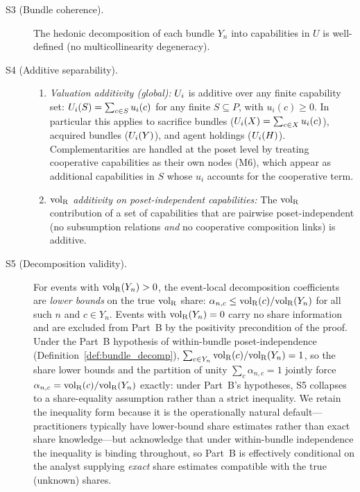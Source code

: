 \begin{description}
\item[S3 (Bundle coherence).] The hedonic decomposition of each
  bundle $Y_n$ into capabilities in $U$ is well-defined (no
  multicollinearity degeneracy).

\item[S4 (Additive separability).] \mbox{}
  \begin{enumerate}
  \item[(a)] \emph{Valuation additivity (global):}
    $U_i$ is additive over any finite capability set:
    $U_i(S) = \sum_{c \in S} u_i(c)$ for any finite
    $S \subseteq P$, with $u_i(c) \geq 0$.  In particular this
    applies to sacrifice bundles ($U_i(X) = \sum_{c \in X}
    u_i(c)$), acquired bundles ($U_i(Y)$), and agent
    holdings ($U_i(H)$).  Complementarities are handled at the
    poset level by treating cooperative capabilities as their
    own nodes (M6), which appear as additional capabilities in
    $S$ whose $u_i$ accounts for the cooperative term.
  \item[(b)] \emph{${\operatorname{vol}_{\mathrm{R}}}$ additivity on poset-independent
    capabilities:} The ${\operatorname{vol}_{\mathrm{R}}}$ contribution of a set of
    capabilities that are pairwise poset-independent (no
    subsumption relations \emph{and} no cooperative composition
    links) is additive.
  \end{enumerate}

\item[S5 (Decomposition validity).] For events with
  ${\operatorname{vol}_{\mathrm{R}}}(Y_n) > 0$, the event-local decomposition
  coefficients are \emph{lower bounds} on the true ${\operatorname{vol}_{\mathrm{R}}}$
  share: $\alpha_{n,c} \leq {\operatorname{vol}_{\mathrm{R}}}(c) / {\operatorname{vol}_{\mathrm{R}}}(Y_n)$ for all
  such $n$ and $c \in Y_n$.  Events with ${\operatorname{vol}_{\mathrm{R}}}(Y_n) = 0$
  carry no share information and are excluded from Part~B by
  the positivity precondition of the proof.  Under the Part~B
  hypothesis of within-bundle poset-independence
  (Definition~\ref{def:bundle_decomp}), $\sum_{c \in Y_n}
  {\operatorname{vol}_{\mathrm{R}}}(c) / {\operatorname{vol}_{\mathrm{R}}}(Y_n) = 1$, so the share lower bounds and
  the partition of unity $\sum_c \alpha_{n,c} = 1$ jointly
  force $\alpha_{n,c} = {\operatorname{vol}_{\mathrm{R}}}(c)/{\operatorname{vol}_{\mathrm{R}}}(Y_n)$ exactly: under
  Part~B's hypotheses, S5 collapses to a share-equality
  assumption rather than a strict inequality.  We retain the
  inequality form because it is the operationally natural
  default---practitioners typically have lower-bound share
  estimates rather than exact share knowledge---but
  acknowledge that under within-bundle independence the
  inequality is binding throughout, so Part~B is effectively
  conditional on the analyst supplying \emph{exact} share
  estimates compatible with the true (unknown) shares.
\end{description}

